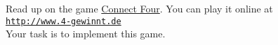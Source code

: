 \exercise
Read up on the game \href{https://en.wikipedia.org/wiki/Connect_Four}{Connect Four}.  You can play it online at
\\[0.2cm]
\hspace*{1.3cm}
\href{http://www.4-gewinnt.de}{\texttt{http://www.4-gewinnt.de}}
\\[0.2cm]
Your task is to implement this game.  
\eox


